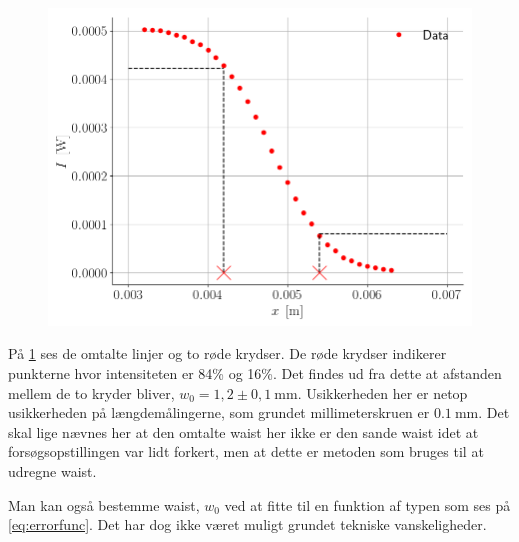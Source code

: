 \documentclass[main]{subfiles}
\begin{document}
\begin{figure}[H]
  \centering
  \includegraphics[width=\linewidth]{tegninger/graf_find_w.png}
  \caption{}
  \label{fig:graf_find_w}
\end{figure}
På \cref{fig:graf_find_w} ses de omtalte linjer og to røde krydser. De røde krydser indikerer punkterne hvor intensiteten er 84\% og 16\%. Det findes ud fra dette at afstanden mellem de to kryder bliver, $w_0 = 1,2 \pm 0,1 \ \si{\milli\meter}$. Usikkerheden her er netop usikkerheden på længdemålingerne, som grundet millimeterskruen er $\SI{0,1}{\milli\meter}$. Det skal lige nævnes her at den omtalte waist her ikke er den sande waist idet at forsøgsopstillingen var lidt forkert, men at dette er metoden som bruges til at udregne waist.

Man kan også bestemme waist, $w_0$ ved at fitte til en funktion af typen som ses på \cref{eq:errorfunc}. Det har dog ikke været muligt grundet tekniske vanskeligheder.
\end{document}
